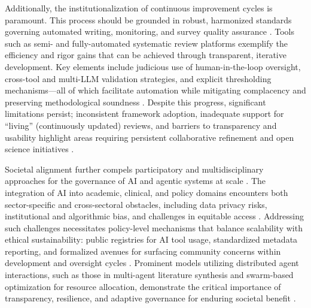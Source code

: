 Additionally, the institutionalization of continuous improvement cycles is paramount. This process should be grounded in robust, harmonized standards governing automated writing, monitoring, and survey quality assurance \cite{ref74,ref75,ref80,ref84,ref98,ref100,ref102,ref104,ref106}. Tools such as semi- and fully-automated systematic review platforms exemplify the efficiency and rigor gains that can be achieved through transparent, iterative development. Key elements include judicious use of human-in-the-loop oversight, cross-tool and multi-LLM validation strategies, and explicit thresholding mechanisms—all of which facilitate automation while mitigating complacency and preserving methodological soundness \cite{ref74,ref80,ref84,ref100,ref102,ref104}. Despite this progress, significant limitations persist; inconsistent framework adoption, inadequate support for “living” (continuously updated) reviews, and barriers to transparency and usability highlight areas requiring persistent collaborative refinement and open science initiatives \cite{ref75,ref80,ref104,ref106}.

Societal alignment further compels participatory and multidisciplinary approaches for the governance of AI and agentic systems at scale \cite{ref1,ref3,ref7,ref10,ref13,ref15,ref22,ref23,ref24,ref25,ref26,ref27,ref29,ref31,ref34,ref35,ref42,ref43,ref44,ref45,ref46,ref47,ref48,ref49,ref50,ref51,ref52,ref53,ref54,ref55,ref56,ref57,ref60,ref64,ref65,ref76,ref78,ref80,ref86,ref87,ref88,ref89,ref90,ref91,ref92,ref93,ref94,ref95,ref96,ref97,ref98,ref100,ref101,ref102,ref103,ref104,ref105,ref106,ref109,ref110,ref111,ref112,ref113,ref114,ref115,ref117}. The integration of AI into academic, clinical, and policy domains encounters both sector-specific and cross-sectoral obstacles, including data privacy risks, institutional and algorithmic bias, and challenges in equitable access \cite{ref90,ref94,ref96,ref97,ref100,ref106}. Addressing such challenges necessitates policy-level mechanisms that balance scalability with ethical sustainability: public registries for AI tool usage, standardized metadata reporting, and formalized avenues for surfacing community concerns within development and oversight cycles \cite{ref95,ref106,ref110,ref113}. Prominent models utilizing distributed agent interactions, such as those in multi-agent literature synthesis and swarm-based optimization for resource allocation, demonstrate the critical importance of transparency, resilience, and adaptive governance for enduring societal benefit \cite{ref31,ref34,ref35,ref47,ref49,ref55}.

